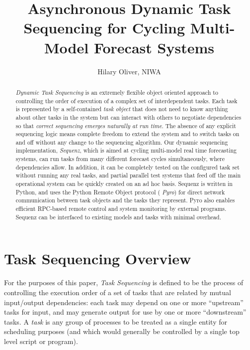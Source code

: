 \documentclass[11pt,a4paper]{article}
\title{Asynchronous Dynamic Task Sequencing 
for Cycling Multi-Model Forecast Systems}
\author{Hilary Oliver, NIWA}
\begin{document}
\maketitle
\tableofcontents

\begin{abstract}

{\em Dynamic Task Sequencing} is an extremely flexible object oriented
approach to controlling the order of execution of a complex set of
interdependent tasks.  Each task is represented by a self-contained {\em
task object} that does not need to know anything about other tasks in
the system but can interact with others to negotiate dependencies so
that {\em correct sequencing emerges naturally at run time}. The absence
of any explicit sequencing logic means complete freedom to extend the
system and to switch tasks on and off without any change to the
sequencing algorithm.  Our dynamic sequencing implementation, {\em
Sequenz}, which is aimed at cycling multi-model real time forecasting
systems, can run tasks from many different forecast cycles
simultaneously, where dependencies allow. In addition, it can be
completely tested on the configured task set without running any real
tasks, and partial parallel test systems that feed off the main
operational system can be quickly created on an ad hoc basis.  Sequenz
is written in Python, and uses the Python Remote Object protocol ({\em
Pyro}) for direct network communication between task objects and the
tasks they represent. Pyro also enables efficient RPC-based remote
control and system monitoring by external programs.  Sequenz can be
interfaced to existing models and tasks with minimal overhead.

\end{abstract}

\section{Task Sequencing Overview}

For the purposes of this paper, {\em Task Sequencing} is defined to be
the process of controlling the execution order of a set of tasks that
are related by mutual input/output dependencies: each task may depend on
one or more ``upstream'' tasks for input, and may generate output for
use by one or more ``downstream'' tasks.  A {\em task} is any group of
processes to be treated as a single entity for scheduling purposes (and
which would generally be controlled by a single top level script or
program).
\end{document}
